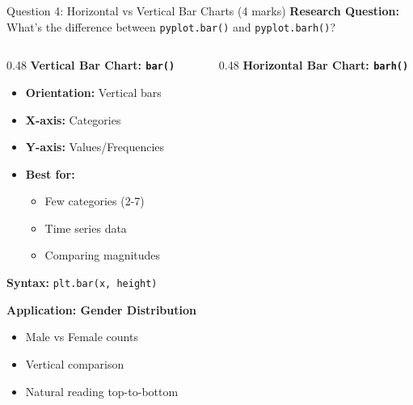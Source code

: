 \documentclass[aspectratio=169]{beamer}
\begin{document}
\begin{frame}{Question 4: Horizontal vs Vertical Bar Charts (4 marks)}
    \textbf{Research Question:} What's the difference between \texttt{pyplot.bar()} and \texttt{pyplot.barh()}?

    \vspace{0.3cm}

    \begin{columns}[T]
        \begin{column}{0.48\textwidth}
            \textbf{Vertical Bar Chart: \texttt{bar()}}

            \begin{itemize}
                \item \textbf{Orientation:} Vertical bars
                \item \textbf{X-axis:} Categories
                \item \textbf{Y-axis:} Values/Frequencies
                \item \textbf{Best for:}
                    \begin{itemize}
                        \item Few categories (2-7)
                        \item Time series data
                        \item Comparing magnitudes
                    \end{itemize}
            \end{itemize}

            \vspace{0.3cm}

            \textbf{Syntax:} \texttt{plt.bar(x, height)}

            \vspace{0.2cm}

            \textbf{Application: Gender Distribution}
            \begin{itemize}
                \item Male vs Female counts
                \item Vertical comparison
                \item Natural reading top-to-bottom
            \end{itemize}
        \end{column}

        \begin{column}{0.48\textwidth}
            \textbf{Horizontal Bar Chart: \texttt{barh()}}


\end{column}
\end{columns}
\end{frame}
\end{document}

